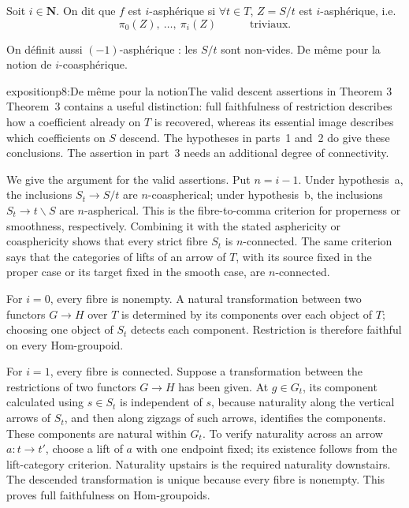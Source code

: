 Soit $i \in \mathbf{N}$. On dit que $f$ est $i$-asphérique si $\forall t \in T$, $Z = S/t$ est $i$-asphérique, i.e.
\[
\pi_0(Z),\ \dots,\ \pi_i(Z) \qquad\quad \text{triviaux.}
\tag*{$(*)$}
\]

On définit aussi $(-1)$-asphérique : les $S/t$ sont non-vides. De même pour la notion de $i$-coasphérique.

\begin{dcomment}{exposition}{p8:De même pour la notion}{The valid descent assertions in Theorem 3}
Theorem~3 contains a useful distinction: full faithfulness of restriction describes how a coefficient already on $T$ is recovered, whereas its essential image describes which coefficients on $S$ descend. The hypotheses in parts~1 and~2 do give these conclusions. The assertion in part~3 needs an additional degree of connectivity.

We give the argument for the valid assertions. Put $n=i-1$. Under hypothesis~a, the inclusions $S_t\to S/t$ are $n$-coaspherical; under hypothesis~b, the inclusions $S_t\to t\backslash S$ are $n$-aspherical. This is the fibre-to-comma criterion for properness or smoothness, respectively. Combining it with the stated asphericity or coasphericity shows that every strict fibre $S_t$ is $n$-connected. The same criterion says that the categories of lifts of an arrow of $T$, with its source fixed in the proper case or its target fixed in the smooth case, are $n$-connected.

For $i=0$, every fibre is nonempty. A natural transformation between two functors $G\to H$ over $T$ is determined by its components over each object of $T$; choosing one object of $S_t$ detects each component. Restriction is therefore faithful on every Hom-groupoid.

For $i=1$, every fibre is connected. Suppose a transformation between the restrictions of two functors $G\to H$ has been given. At $g\in G_t$, its component calculated using $s\in S_t$ is independent of $s$, because naturality along the vertical arrows of $S_t$, and then along zigzags of such arrows, identifies the components. These components are natural within $G_t$. To verify naturality across an arrow $a:t\to t'$, choose a lift of $a$ with one endpoint fixed; its existence follows from the lift-category criterion. Naturality upstairs is the required naturality downstairs. The descended transformation is unique because every fibre is nonempty. This proves full faithfulness on Hom-groupoids.


\end{dcomment}
